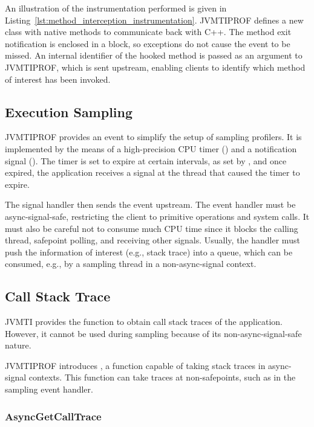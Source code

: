 An illustration of the instrumentation performed is given in Listing~\ref{lst:method_interception_instrumentation}. JVMTIPROF defines a new class with native methods to communicate back with C++. The method exit notification is enclosed in a  block, so exceptions do not cause the event to be missed. An internal identifier of the hooked method is passed as an argument to JVMTIPROF, which is sent upstream, enabling clients to identify which method of interest has been invoked.

\subsection{Execution Sampling}

JVMTIPROF provides an event to simplify the setup of sampling profilers. It is implemented by the means of a high-precision CPU timer () and a notification signal (). The timer is set to expire at certain intervals, as set by , and once expired, the application receives a signal at the thread that caused the timer to expire.

The signal handler then sends the event upstream. The event handler must be async-signal-safe, restricting the client to primitive operations and system calls. It must also be careful not to consume much CPU time since it blocks the calling thread, safepoint polling, and receiving other signals. Usually, the handler must push the information of interest (e.g., stack trace) into a queue, which can be consumed, e.g., by a sampling thread in a non-async-signal context.

\subsection{Call Stack Trace} \label{sec:impl_callstacktrace}

JVMTI provides the  function to obtain call stack traces of the application. However, it cannot be used during sampling because of its non-async-signal-safe nature.

JVMTIPROF introduces , a function capable of taking stack traces in async-signal contexts. This function can take traces at non-safepoints, such as in the sampling event handler.

\subsubsection*{AsyncGetCallTrace}

